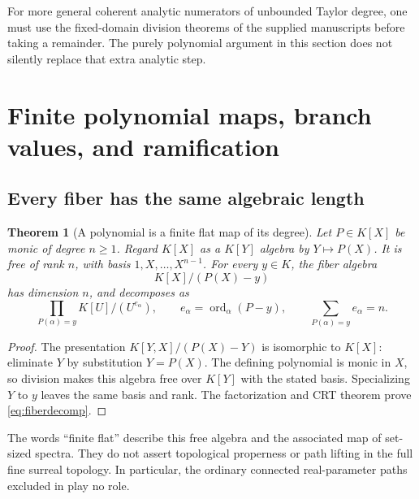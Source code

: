\documentclass[11pt,letterpaper]{article}
\numberwithin{equation}{section}
\newtheorem{theorem}{Theorem}[section]
\theoremstyle{definition}
\theoremstyle{remark}
\newcommand{\ord}{\operatorname{ord}}
\begin{document}
For more general coherent analytic numerators of unbounded Taylor degree,
one must use the fixed-domain division theorems of the supplied manuscripts
before taking a remainder. The purely polynomial argument in this section
does not silently replace that extra analytic step.

\section{Finite polynomial maps, branch values, and ramification}\label{sec:maps}

\subsection{Every fiber has the same algebraic length}
\begin{theorem}[A polynomial is a finite flat map of its degree]\label{thm:finitemap}
Let $P\in K[X]$ be monic of degree $n\ge1$. Regard $K[X]$ as a $K[Y]$
algebra by $Y\mapsto P(X)$. It is free of rank $n$, with basis
$1,X,\ldots,X^{n-1}$. For every $y\in K$, the fiber algebra
\[
 K[X]/(P(X)-y)
\]
has dimension $n$, and decomposes as
\begin{equation}\label{eq:fiberdecomp}
 \prod_{P(\alpha)=y}K[U]/(U^{e_\alpha}),
 \qquad e_\alpha=\ord_\alpha(P-y),\qquad
 \sum_{P(\alpha)=y}e_\alpha=n.
\end{equation}
\end{theorem}
\begin{proof}
The presentation $K[Y,X]/(P(X)-Y)$ is isomorphic to $K[X]$: eliminate
$Y$ by substitution $Y=P(X)$. The defining polynomial is monic in $X$,
so division makes this algebra free over $K[Y]$ with the stated basis.
Specializing $Y$ to $y$ leaves the same basis and rank. The factorization
and CRT theorem prove \eqref{eq:fiberdecomp}.
\end{proof}

The words ``finite flat'' describe this free algebra and the associated
map of set-sized spectra. They do not assert topological properness or
path lifting in the full fine surreal topology. In particular, the
ordinary connected real-parameter paths excluded in
\cite{SourceAnalysis} play no role.
\end{document}
